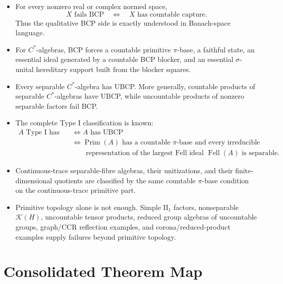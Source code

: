 \documentclass[11pt]{article}
\newcommand{\Prim}{\operatorname{Prim}}
\newcommand{\Kcal}{\mathcal K}
\begin{document}
\begin{itemize}
\item For every nonzero real or complex normed space,
\[
        X\text{ fails BCP}
        \quad\Longleftrightarrow\quad
        X\text{ has countable capture}.
\]
Thus the qualitative BCP side is exactly understood in Banach-space language.

\item For \(C^*\)-algebras, BCP forces a countable primitive \(\pi\)-base, a
faithful state, an essential ideal generated by a countable BCP blocker, and
an essential \(\sigma\)-unital hereditary support built from the blocker
squares.

\item Every separable \(C^*\)-algebra has UBCP.  More generally, countable
products of separable \(C^*\)-algebras have UBCP, while uncountable products
of nonzero separable factors fail BCP.

\item The complete Type I classification is known:
\[
\begin{aligned}
A\text{ Type I has BCP}
&\Longleftrightarrow A\text{ has UBCP}\\
&\Longleftrightarrow
\Prim(A)\text{ has a countable }\pi\text{-base and every irreducible}\\
&\qquad\text{representation of the largest Fell ideal } \operatorname{Fell}(A)
\text{ is separable.}
\end{aligned}
\]

\item Continuous-trace separable-fibre algebras, their unitizations, and their
finite-dimensional quotients are classified by the same countable
\(\pi\)-base condition on the continuous-trace primitive part.

\item Primitive topology alone is not enough.  Simple \(\mathrm{II}_1\)
factors, nonseparable \(\Kcal(H)\), uncountable tensor products, reduced group
algebras of uncountable groups, graph/CCR reflection examples, and
corona/reduced-product examples supply failures beyond primitive topology.
\end{itemize}

\section*{Consolidated Theorem Map}
\end{document}
